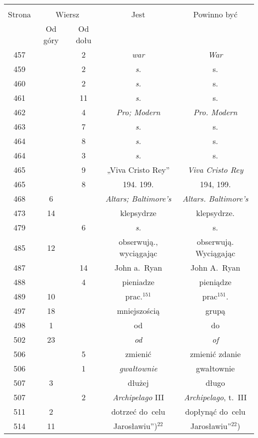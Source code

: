 \documentclass[a4paper,11pt]{article}
\begin{document}
\begin{center}
  \begin{tabular}{|c|c|c|c|c|}
    \hline
    & \multicolumn{2}{c|}{} & & \\
    Strona & \multicolumn{2}{c|}{Wiersz} & Jest
                              & Powinno być \\ \cline{2-3}
    & Od góry & Od dołu & & \\
    \hline
    457 & &  2 & \emph{war} & \emph{War} \\
    459 & &  2 & \emph{s.} & s. \\
    460 & &  2 & \emph{s.} & s. \\
    461 & & 11 & \emph{s.} & s. \\
    462 & &  4 & \emph{Pro; Modern} & \emph{Pro. Modern} \\
    463 & &  7 & \emph{s.} & s. \\
    464 & &  8 & \emph{s.} & s. \\
    464 & &  3 & \emph{s.} & s. \\
    465 & &  9 & „Viva Cristo Rey” & \emph{Viva Cristo Rey} \\
    465 & &  8 & 194. 199. & 194, 199. \\
    468 &  6 & & \emph{Altars; Baltimore's} & \emph{Altars. Baltimore's} \\
    473 & 14 & & klepsydrze & klepsydrze. \\
    479 & &  6 & \emph{s.} & s. \\
    485 & 12 & & obserwują., wyciągając & obserwują. Wyciągając \\
    487 & & 14 & John a.~Ryan & John A.~Ryan \\
    488 & &  4 & pieniadze & pieniądze \\
    489 & 10 & & prac.$^{151}$ & prac$^{151}$. \\
    497 & 18 & & mniejszością & grupą \\
    498 &  1 & & od & do \\
    502 & 23 & & \emph{od} & \emph{of} \\
    506 & &  5 & zmienić & zmienić zdanie \\
    506 & &  1 & \emph{gwałtownie} & gwałtownie \\
    507 &  3 & & dłużej & długo \\
    507 & &  2 & \emph{Archipelago} III & \emph{Archipelago}, t.~III \\
    511 &  2 & & dotrzeć do~celu & dopłynąć do~celu \\
    514 & 11 & & Jarosławiu”)$^{ 22 }$ & Jarosławiu”$^{ 22 }$) \\

\end{tabular}
\end{center}
\end{document}
